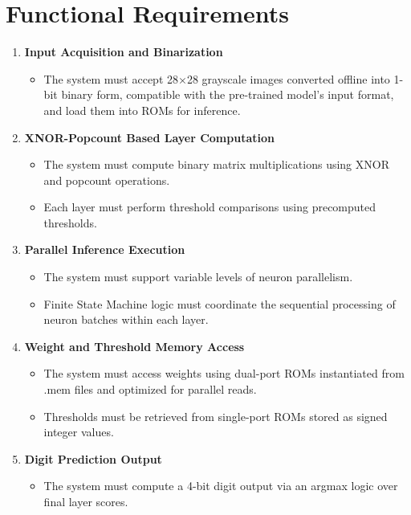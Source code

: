 \documentclass[a4paper,12pt]{report}
\begin{document}
\section{Functional Requirements}
\begin{enumerate}[label=(\roman*)]
    \item \textbf{Input Acquisition and Binarization}
    \begin{itemize}
        \item The system must accept 28$\times$28 grayscale images converted offline into 1-bit binary form, compatible with the pre-trained model’s input format, and load them into ROMs for inference.
    \end{itemize}
    
    \item \textbf{XNOR-Popcount Based Layer Computation}
    \begin{itemize}
        \item The system must compute binary matrix multiplications using XNOR and popcount operations.
        \item Each layer must perform threshold comparisons using precomputed thresholds.
    \end{itemize}
    
    \item \textbf{Parallel Inference Execution}
    \begin{itemize}
        \item The system must support variable levels of neuron parallelism.
        \item Finite State Machine logic must coordinate the sequential processing of neuron batches within each layer.
    \end{itemize}
    
    \item \textbf{Weight and Threshold Memory Access}
    \begin{itemize}
        \item The system must access weights using dual-port ROMs instantiated from .mem files and optimized for parallel reads.
        \item Thresholds must be retrieved from single-port ROMs stored as signed integer values.
    \end{itemize}
    
    \item \textbf{Digit Prediction Output}
    \begin{itemize}
        \item The system must compute a 4-bit digit output via an argmax logic over final layer scores.
    \end{itemize}
    

\end{enumerate}
\end{document}
